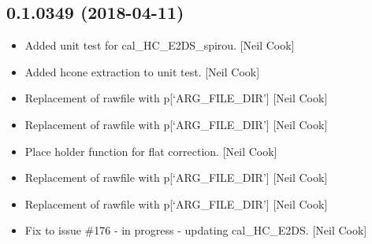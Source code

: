 \documentclass[a4paper,10pt,english]{report}
\begin{document}
\subsection{0.1.0349 (2018-04-11)}
\label{\detokenize{misc/changelog:id463}}\begin{itemize}
\item {} 
Added unit test for cal\_HC\_E2DS\_spirou. {[}Neil Cook{]}

\item {} 
Added hcone extraction to unit test. {[}Neil Cook{]}

\item {} 
Replacement of rawfile with p{[}‘ARG\_FILE\_DIR’{]} {[}Neil Cook{]}

\item {} 
Replacement of rawfile with p{[}‘ARG\_FILE\_DIR’{]} {[}Neil Cook{]}

\item {} 
Place holder function for flat correction. {[}Neil Cook{]}

\item {} 
Replacement of rawfile with p{[}‘ARG\_FILE\_DIR’{]} {[}Neil Cook{]}

\item {} 
Replacement of rawfile with p{[}‘ARG\_FILE\_DIR’{]} {[}Neil Cook{]}

\item {} 
Fix to issue \#176 - in progress - updating cal\_HC\_E2DS. {[}Neil Cook{]}

\end{itemize}
\end{document}
